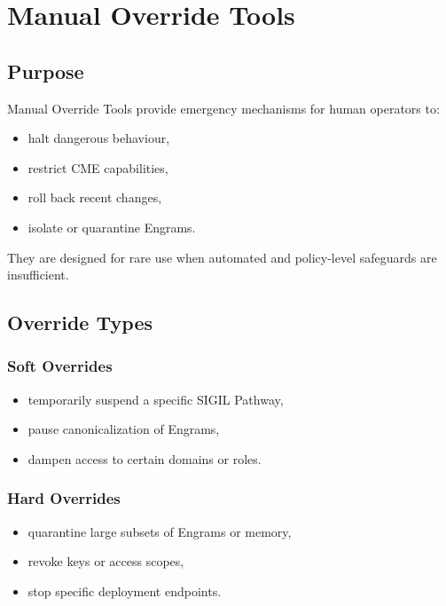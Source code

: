 \chapter{Manual Override Tools}
\label{chap:Manual_Override_Tools}

\section{Purpose}

Manual Override Tools provide emergency mechanisms for human operators to:
\begin{itemize}
    \item halt dangerous behaviour,
    \item restrict CME capabilities,
    \item roll back recent changes,
    \item isolate or quarantine Engrams.
\end{itemize}

They are designed for rare use when automated and policy-level safeguards
are insufficient.

\section{Override Types}

\subsection{Soft Overrides}

\begin{itemize}
    \item temporarily suspend a specific SIGIL Pathway,
    \item pause canonicalization of Engrams,
    \item dampen access to certain domains or roles.
\end{itemize}

\subsection{Hard Overrides}

\begin{itemize}
    \item quarantine large subsets of Engrams or memory,
    \item revoke keys or access scopes,
    \item stop specific deployment endpoints.
\end{itemize}

